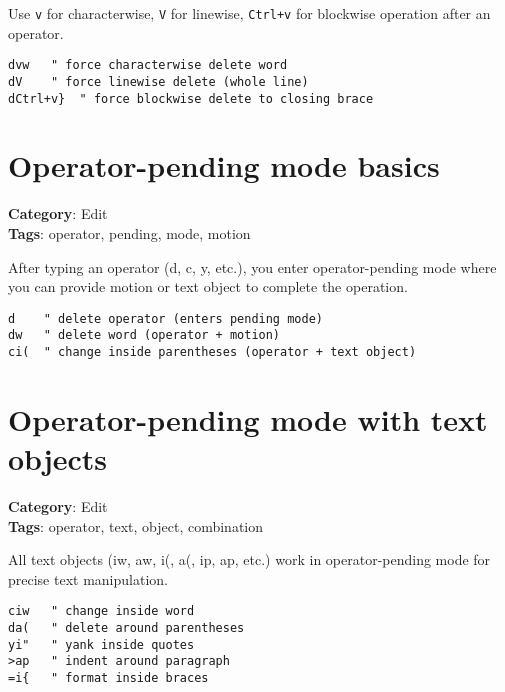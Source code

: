{{{{Use {\footnotesize \Verb§v§} for characterwise, {\footnotesize \Verb§V§} for linewise, {\footnotesize \Verb§Ctrl+v§} for blockwise operation after an operator.

\begin{Exa*}{}
\begin{Verbatim}[fontsize=\footnotesize, breaklines, breakanywhere]
dvw   " force characterwise delete word
dV    " force linewise delete (whole line)
dCtrl+v}  " force blockwise delete to closing brace
\end{Verbatim}
\end{Exa*}

\section{Operator-pending mode basics}

\textbf{Category}: Edit\\ \textbf{Tags}: operator, pending, mode, motion
\vspace{0.5cm}

After typing an operator (d, c, y, etc.), you enter operator-pending mode where you can provide motion or text object to complete the operation.

\begin{Exa*}{}
\begin{Verbatim}[fontsize=\footnotesize, breaklines, breakanywhere]
d    " delete operator (enters pending mode)
dw   " delete word (operator + motion)
ci(  " change inside parentheses (operator + text object)
\end{Verbatim}
\end{Exa*}

\section{Operator-pending mode with text objects}

\textbf{Category}: Edit\\ \textbf{Tags}: operator, text, object, combination
\vspace{0.5cm}

All text objects (iw, aw, i(, a(, ip, ap, etc.) work in operator-pending mode for precise text manipulation.

\begin{Exa*}{}
\begin{Verbatim}[fontsize=\footnotesize, breaklines, breakanywhere]
ciw   " change inside word
da(   " delete around parentheses
yi"   " yank inside quotes
>ap   " indent around paragraph
=i{   " format inside braces
\end{Verbatim}
\end{Exa*}

}}}}
